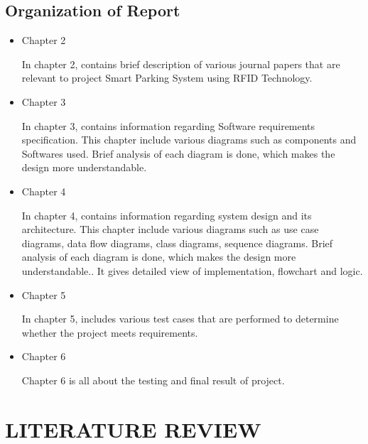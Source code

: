 \documentclass[12pt,a4paper]{report}
\begin{document}
\section{Organization of Report}		
\begin{itemize}
	\item Chapter 2
	
	In chapter 2, contains brief description of various journal papers that are relevant to project Smart Parking System using RFID Technology.
	
	\item Chapter 3
	
	In chapter 3, contains information regarding Software requirements specification. This chapter include various diagrams such as components and Softwares used. Brief analysis of each diagram is done, which makes the design more understandable.
	
	\item Chapter 4
	
	
In chapter 4, contains information regarding system design and its architecture. This chapter include various diagrams such as use case diagrams, data flow diagrams, class diagrams, sequence diagrams. Brief analysis of each diagram is done, which makes the design more understandable.. It gives detailed view of implementation, flowchart and logic.
	
	\item Chapter 5
	
	In chapter 5, includes various test cases that are performed to determine whether the project meets requirements.
	
	\item Chapter 6
	
	Chapter 6 is all about the testing and final result of project. 
\end{itemize}
\newpage
\chapter{LITERATURE REVIEW}
\end{document}

